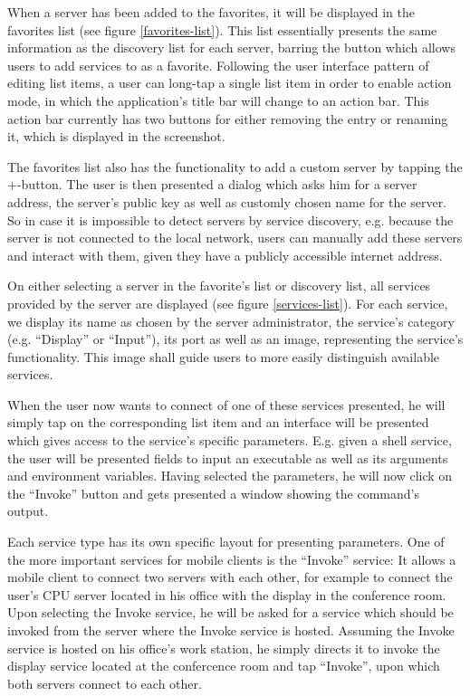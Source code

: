 When a server has been added to the favorites, it will be displayed in the favorites list (see figure \ref{favorites-list}).
This list essentially presents the same information as the discovery list for each server, barring the button which allows users to add services to as a favorite.
Following the user interface pattern of editing list items, a user can long-tap a single list item in order to enable action mode, in which the application's title bar will change to an action bar.
This action bar currently has two buttons for either removing the entry or renaming it, which is displayed in the screenshot.

The favorites list also has the functionality to add a custom server by tapping the $+$-button.
The user is then presented a dialog which asks him for a server address, the server's public key as well as customly chosen name for the server.
So in case it is impossible to detect servers by service discovery, e.g. because the server is not connected to the local network, users can manually add these servers and interact with them, given they have a publicly accessible internet address.

On either selecting a server in the favorite's list or discovery list, all services provided by the server are displayed (see figure \ref{services-list}).
For each service, we display its name as chosen by the server administrator, the service's category (e.g. ``Display'' or ``Input''), its port as well as an image, representing the service's functionality.
This image shall guide users to more easily distinguish available services.

When the user now wants to connect of one of these services presented, he will simply tap on the corresponding list item and an interface will be presented which gives access to the service's specific parameters.
E.g. given a shell service, the user will be presented fields to input an executable as well as its arguments and environment variables.
Having selected the parameters, he will now click on the ``Invoke'' button and gets presented a window showing the command's output.

Each service type has its own specific layout for presenting parameters.
One of the more important services for mobile clients is the ``Invoke'' service:
It allows a mobile client to connect two servers with each other, for example to connect the user's CPU server located in his office with the display in the conference room.
Upon selecting the Invoke service, he will be asked for a service which should be invoked from the server where the Invoke service is hosted.
Assuming the Invoke service is hosted on his office's work station, he simply directs it to invoke the display service located at the confercence room and tap ``Invoke'', upon which both servers connect to each other.

